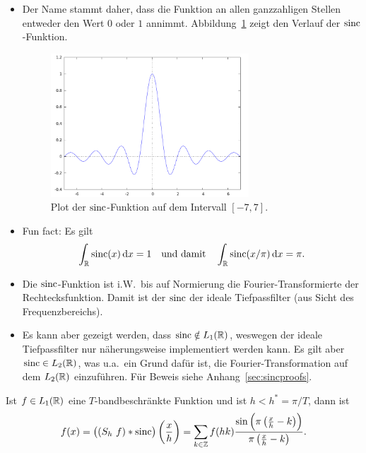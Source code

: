 \begin{remark}\leavevmode
\begin{itemize}
\item Der Name stammt daher, dass die Funktion an allen ganzzahligen Stellen entweder den Wert 
  $ 0 $ oder $ 1 $ annimmt. Abbildung~\ref{fig:sinc} zeigt den Verlauf der $ \operatorname{sinc} $-Funktion.
  \begin{figure}[ht]
  \centering
  \includegraphics[width=0.7\textwidth]{Bilder/sinc}
  \caption{Plot der $ \operatorname{sinc} $-Funktion auf dem Intervall $ [-7,7] $.}
  \label{fig:sinc}
  \end{figure}
\item Fun fact: Es gilt
  \[
    \int_{\R} \sinc(x) \dif x = 1 \quad \text{und damit} \quad
    \int_{\R} \sinc(x / \pi) \dif x = \pi.
  \]
\item Die $ \operatorname{sinc} $-Funktion ist i.W.\ bis auf Normierung die Fourier-Transformierte der
  Rechtecksfunktion. Damit ist der $ \operatorname{sinc} $ der ideale Tiefpassfilter (aus Sicht des
  Frequenzbereichs).
\item Es kann aber gezeigt werden, dass $ \operatorname{sinc} \notin L_{1}(\mathbb{R}) $, weswegen der ideale 
  Tiefpassfilter nur näherungsweise implementiert werden kann. Es gilt aber
  $ \operatorname{sinc} \in L_{2}(\mathbb{R}) $, was u.a.\ ein Grund dafür ist, die Fourier-Transformation auf dem
  $ L_{2}(\mathbb{R}) $ einzuführen. Für Beweis siehe Anhang~\ref{sec:sincproofs}.
\end{itemize}
\end{remark}

\begin{proposition}
Ist $ f \in L_{1}(\mathbb{R}) $ eine $ T $-bandbeschränkte Funktion und ist $ h < h^{*} = \pi / T $, dann 
ist
\[
  f(x) = \left( (S_{h} \ f) * \operatorname{sinc} \right) \left( \frac{x}{h} \right) 
       = \sum_{k \in \mathbb{Z}} f(hk) 
           \frac{\sin \left( \pi \left( \frac{x}{h} - k \right) \right)}
                {\pi \left( \frac{x}{h} - k \right)}.
\]
\end{proposition}

